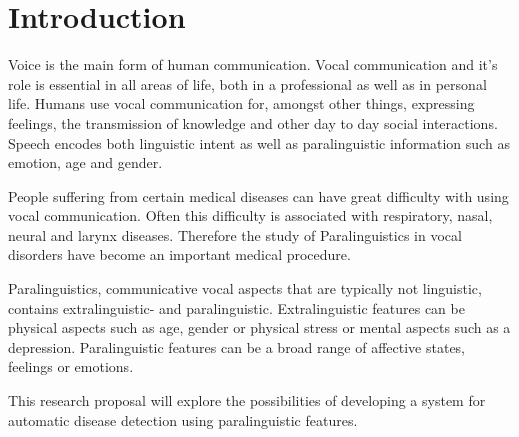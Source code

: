 \documentclass[conference]{IEEEtran}
\begin{document}




%
\IEEEpeerreviewmaketitle



\section{Introduction} \label{introduction}


Voice is the main form of human communication. Vocal communication and it's role is essential in all areas of life, both in a professional as well as in personal life. Humans use vocal communication for, amongst other things, expressing feelings, the transmission of knowledge and other day to day social interactions. Speech encodes both linguistic intent as well as paralinguistic information such as emotion, age and gender. \cite{c1}

People suffering from certain medical diseases can have great difficulty with using vocal communication. Often this difficulty is associated with respiratory, nasal, neural and larynx diseases. Therefore the study of Paralinguistics in vocal disorders have become an important medical procedure.

Paralinguistics, communicative vocal aspects that are typically not linguistic, contains extralinguistic- and paralinguistic. Extralinguistic features can be physical aspects such as age, gender or physical stress or mental aspects such as a depression. Paralinguistic features can be a broad range of affective states, feelings or emotions. \cite{c3}

This research proposal will explore the possibilities of developing a system for automatic disease detection using paralinguistic features.

%
%
\end{document}
